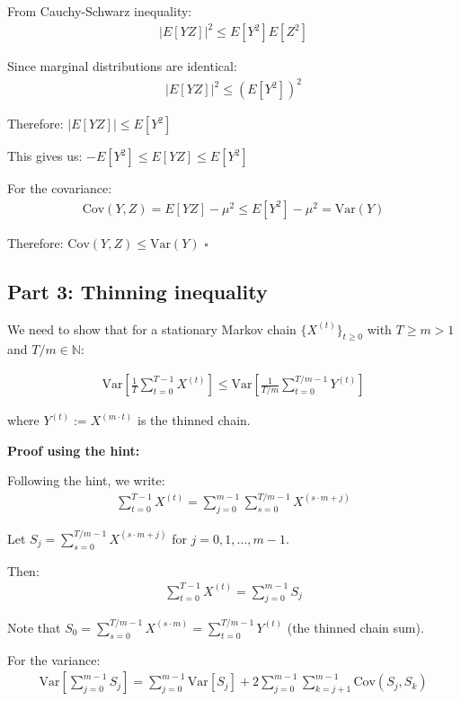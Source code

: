 \documentclass[11pt,a4paper]{article}
\begin{document}
From Cauchy-Schwarz inequality:
\begin{align}
|E[YZ]|^2 \leq E[Y^2]E[Z^2]
\end{align}

Since marginal distributions are identical:
\begin{align}
|E[YZ]|^2 \leq (E[Y^2])^2
\end{align}

Therefore: $|E[YZ]| \leq E[Y^2]$

This gives us: $-E[Y^2] \leq E[YZ] \leq E[Y^2]$

For the covariance:
\begin{align}
\text{Cov}(Y,Z) = E[YZ] - \mu^2 \leq E[Y^2] - \mu^2 = \text{Var}(Y)
\end{align}

Therefore: $\text{Cov}(Y,Z) \leq \text{Var}(Y)$ $\square$

\subsection{Part 3: Thinning inequality}

We need to show that for a stationary Markov chain $\{X^{(t)}\}_{t \geq 0}$ with $T \geq m > 1$ and $T/m \in \mathbb{N}$:

\begin{align}
\text{Var}\left[\frac{1}{T}\sum_{t=0}^{T-1} X^{(t)}\right] \leq \text{Var}\left[\frac{1}{T/m}\sum_{t=0}^{T/m-1} Y^{(t)}\right]
\end{align}

where $Y^{(t)} := X^{(m \cdot t)}$ is the thinned chain.

\textbf{Proof using the hint:}

Following the hint, we write:
\begin{align}
\sum_{t=0}^{T-1} X^{(t)} = \sum_{j=0}^{m-1} \sum_{s=0}^{T/m-1} X^{(s \cdot m + j)}
\end{align}

Let $S_j = \sum_{s=0}^{T/m-1} X^{(s \cdot m + j)}$ for $j = 0, 1, \ldots, m-1$.

Then:
\begin{align}
\sum_{t=0}^{T-1} X^{(t)} = \sum_{j=0}^{m-1} S_j
\end{align}

Note that $S_0 = \sum_{s=0}^{T/m-1} X^{(s \cdot m)} = \sum_{t=0}^{T/m-1} Y^{(t)}$ (the thinned chain sum).

For the variance:
\begin{align}
\text{Var}\left[\sum_{j=0}^{m-1} S_j\right] = \sum_{j=0}^{m-1} \text{Var}[S_j] + 2\sum_{j=0}^{m-1}\sum_{k=j+1}^{m-1} \text{Cov}(S_j, S_k)
\end{align}
\end{document}
